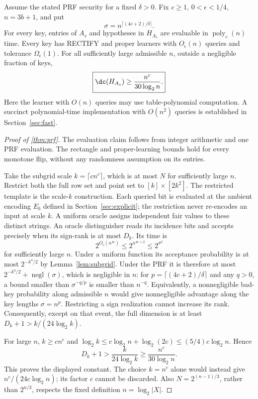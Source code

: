 \begin{theorem}\label{thm:prf}
Assume the stated PRF security for a fixed $\delta>0$. Fix $c\ge1$, $0<\epsilon<1/4$, $n=3b+1$, and put
\[
 \sigma=n^{\lceil(4c+2)/\delta\rceil}.
\]
For every key, entries of $A_s$ and hypotheses in $H_{A_s}$ are evaluable in $\operatorname{poly}_c(n)$ time. Every key has RECTIFY and proper learners with $O_\epsilon(n)$ queries and tolerance $\Omega_\epsilon(1)$. For all sufficiently large admissible $n$, outside a negligible fraction of keys,
\[
 \boxed{\dc(H_{A_s})\ge\frac{n^c}{30\log_2n}.}
\]
Here the learner with $O(n)$ queries may use table-polynomial computation. A succinct polynomial-time implementation with $O(n^2)$ queries is established in Section~\ref{sec:fast}.
\end{theorem}

\begin{proof}[Proof of \cref{thm:prf}]
The evaluation claim follows from integer arithmetic and one PRF evaluation. The rectangle and proper-learning bounds hold for every monotone flip, without any randomness assumption on its entries.

Take the subgrid scale $k=\lceil c n^c\rceil$, which is at most $N$ for sufficiently large $n$. Restrict both the full row set and point set to $[k]\times[2k^2]$. The restricted template is the scale-$k$ construction. Each queried bit is evaluated at the ambient encoding $E_b$ defined in Section~\ref{sec:explicit}; the restriction never re-encodes an input at scale $k$. A uniform oracle assigns independent fair values to these distinct strings. An oracle distinguisher reads its incidence bits and accepts precisely when its sign-rank is at most $D_k$. Its time is
\[
 2^{O_c(n^{4c})}\le2^{n^{4c+2}}\le2^{\sigma^\delta}
\]
for sufficiently large $n$. Under a uniform function its acceptance probability is at most $2^{-k^4/2}$ by Lemma~\ref{lem:subgrid}. Under the PRF it is therefore at most $2^{-k^4/2}+\operatorname{negl}(\sigma)$, which is negligible in $n$: for $p=\lceil(4c+2)/\delta\rceil$ and any $q>0$, a bound smaller than $\sigma^{-q/p}$ is smaller than $n^{-q}$. Equivalently, a nonnegligible bad-key probability along admissible $n$ would give nonnegligible advantage along the key lengths $\sigma=n^p$. Restricting a sign realization cannot increase its rank. Consequently, except on that event, the full dimension is at least $D_k+1>k/(24\log_2k)$.

For large $n$, $k\ge c n^c$ and $\log_2k\le c\log_2n+\log_2(2c)\le(5/4)c\log_2n$. Hence
\[
 D_k+1>\frac{k}{24\log_2k}\ge\frac{n^c}{30\log_2n}.
\]
This proves the displayed constant. The choice $k=n^c$ alone would instead give $n^c/(24c\log_2n)$; its factor $c$ cannot be discarded. Also $N=2^{(n-1)/3}$, rather than $2^{n/3}$, respects the fixed definition $n=\log_2|X|$.
\end{proof}
